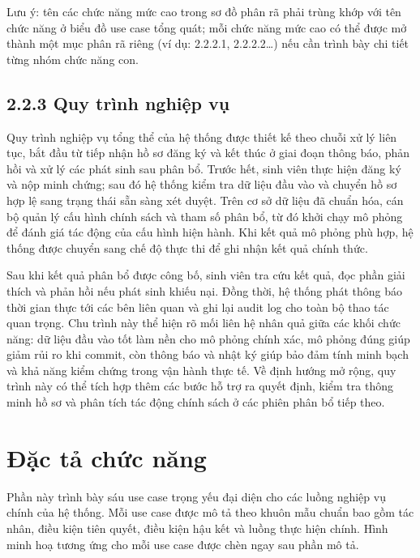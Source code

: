﻿\documentclass[a4paper,12pt,openany,oneside]{report}
\begin{document}
Lưu ý: tên các chức năng mức cao trong sơ đồ phân rã phải trùng khớp với tên chức năng ở biểu đồ use case tổng quát; mỗi chức năng mức cao có thể được mở thành một mục phân rã riêng (ví dụ: 2.2.2.1, 2.2.2.2…) nếu cần trình bày chi tiết từng nhóm chức năng con.

\subsection*{2.2.3 Quy trình nghiệp vụ}

Quy trình nghiệp vụ tổng thể của hệ thống được thiết kế theo chuỗi xử lý liên tục, bắt đầu từ tiếp nhận hồ sơ đăng ký và kết thúc ở giai đoạn thông báo, phản hồi và xử lý các phát sinh sau phân bổ. Trước hết, sinh viên thực hiện đăng ký và nộp minh chứng; sau đó hệ thống kiểm tra dữ liệu đầu vào và chuyển hồ sơ hợp lệ sang trạng thái sẵn sàng xét duyệt. Trên cơ sở dữ liệu đã chuẩn hóa, cán bộ quản lý cấu hình chính sách và tham số phân bổ, từ đó khởi chạy mô phỏng để đánh giá tác động của cấu hình hiện hành. Khi kết quả mô phỏng phù hợp, hệ thống được chuyển sang chế độ thực thi để ghi nhận kết quả chính thức.

Sau khi kết quả phân bổ được công bố, sinh viên tra cứu kết quả, đọc phần giải thích và phản hồi nếu phát sinh khiếu nại. Đồng thời, hệ thống phát thông báo thời gian thực tới các bên liên quan và ghi lại audit log cho toàn bộ thao tác quan trọng. Chu trình này thể hiện rõ mối liên hệ nhân quả giữa các khối chức năng: dữ liệu đầu vào tốt làm nền cho mô phỏng chính xác, mô phỏng đúng giúp giảm rủi ro khi commit, còn thông báo và nhật ký giúp bảo đảm tính minh bạch và khả năng kiểm chứng trong vận hành thực tế. Về định hướng mở rộng, quy trình này có thể tích hợp thêm các bước hỗ trợ ra quyết định, kiểm tra thông minh hồ sơ và phân tích tác động chính sách ở các phiên phân bổ tiếp theo.

\section{Đặc tả chức năng}

Phần này trình bày sáu use case trọng yếu đại diện cho các luồng nghiệp vụ chính của hệ thống. Mỗi use case được mô tả theo khuôn mẫu chuẩn bao gồm tác nhân, điều kiện tiên quyết, điều kiện hậu kết và luồng thực hiện chính. Hình minh hoạ tương ứng cho mỗi use case được chèn ngay sau phần mô tả.
\end{document}
